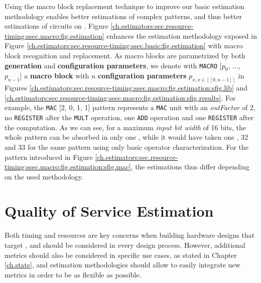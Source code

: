         Using the macro block replacement technique to improve our basic estimation methodology enables better estimations of complex patterns, and thus better estimations of \firrtl{} circuits on .
        Figure \ref{ch.estimators:sec.resource-timing:ssec.macro:fig.estimation} enhances the estimation methodology exposed in Figure \ref{ch.estimators:sec.resource-timing:ssec.basic:fig.estimation} with macro block recognition and replacement.
        As macro blocks are parametrized by both {\bf generation} and {\bf configuration parameters}, we denote with {\tt MACRO} [$p_0$, ..., $p_{n-1}$] a {\bf macro block} with $n$ {\bf configuration parameters} $p_{x, x \in [\![0, n-1]\!]}$ in Figures \ref{ch.estimators:sec.resource-timing:ssec.macro:fig.estimation:sfig.lib} and \ref{ch.estimators:sec.resource-timing:ssec.macro:fig.estimation:sfig.results}.
        For example, the {\tt MAC} [2, 0, 1, 1] pattern represents a {\tt MAC} unit with an {\it outFactor} of 2, no {\tt REGISTER} after the {\tt MULT} operation, one {\tt ADD} operation and one {\tt REGISTER} after the computation. 
        As we can see, for a maximum {\it input bit width} of 16 bits, the whole pattern can be absorbed in only one , while it would have taken one , 32  and 33  for the same pattern using only basic operator characterization.
        For the pattern introduced in Figure \ref{ch.estimators:sec.resource-timing:ssec.macro:fig.estimation:sfig.mac}, the estimations thus differ depending on the used methodology.



\vspace{-0.15cm}
\section{Quality of Service Estimation}
\label{ch.estimators:sec.qos}
\vspace{-0.1cm}

    Both timing and resources are key concerns when building hardware designs that target , and should be considered in every design process.
    However, additional metrics should also be considered in specific use cases, as stated in Chapter \ref{ch.state}, and estimation methodologies should allow to easily integrate new metrics in order to be as flexible as possible.

